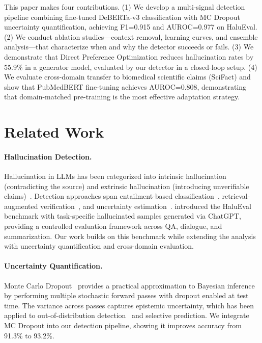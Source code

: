 \documentclass[11pt]{article}
\begin{document}
This paper makes four contributions. (1) We develop a multi-signal detection pipeline combining fine-tuned DeBERTa-v3 classification with MC Dropout uncertainty quantification, achieving F1=0.915 and AUROC=0.977 on HaluEval. (2) We conduct ablation studies---context removal, learning curves, and ensemble analysis---that characterize when and why the detector succeeds or fails. (3) We demonstrate that Direct Preference Optimization reduces hallucination rates by 55.9\% in a generator model, evaluated by our detector in a closed-loop setup. (4) We evaluate cross-domain transfer to biomedical scientific claims (SciFact) and show that PubMedBERT fine-tuning achieves AUROC=0.808, demonstrating that domain-matched pre-training is the most effective adaptation strategy.


\section{Related Work}

\paragraph{Hallucination Detection.} Hallucination in LLMs has been categorized into intrinsic hallucination (contradicting the source) and extrinsic hallucination (introducing unverifiable claims)~\citep{ji2023survey}. Detection approaches span entailment-based classification~\citep{honovich2022true}, retrieval-augmented verification~\citep{min2023factscore}, and uncertainty estimation~\citep{kuhn2023semantic}. \citet{li2023halueval} introduced the HaluEval benchmark with task-specific hallucinated samples generated via ChatGPT, providing a controlled evaluation framework across QA, dialogue, and summarization. Our work builds on this benchmark while extending the analysis with uncertainty quantification and cross-domain evaluation.

\paragraph{Uncertainty Quantification.} Monte Carlo Dropout~\citep{gal2016dropout} provides a practical approximation to Bayesian inference by performing multiple stochastic forward passes with dropout enabled at test time. The variance across passes captures epistemic uncertainty, which has been applied to out-of-distribution detection~\citep{lakshminarayanan2017simple} and selective prediction. We integrate MC Dropout into our detection pipeline, showing it improves accuracy from 91.3\% to 93.2\%.
\end{document}
